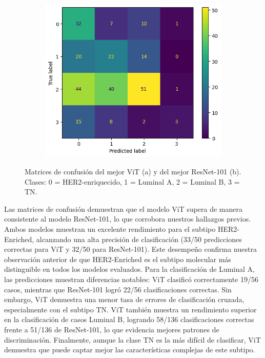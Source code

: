 \documentclass[a4paper,10pt]{book}
\begin{document}
\begin{figure}[h!]
\begin{subfigure}[t]{0.48\textwidth}
        \includegraphics[width=\textwidth]{reports/assets/CM-42-ResNet.png}
        \caption{}
        \label{fig:cm_resnet}
    \end{subfigure}
    \caption[Matrices de confusión Mejor ViT vs. Mejor ResNet]{Matrices de confusión del mejor ViT (a) y del mejor ResNet-101 (b). Clases: 0 = HER2-enriquecido, 1 = Luminal A, 2 = Luminal B, 3 = TN.}
    \label{fig:cm_vit_resnet}
\end{figure}

Las matrices de confusión demuestran que el modelo ViT supera de manera consistente al modelo ResNet-101, lo que corrobora nuestros hallazgos previos. Ambos modelos muestran un excelente rendimiento para el subtipo HER2-Enriched, alcanzando una alta precisión de clasificación (33/50 predicciones correctas para ViT y 32/50 para ResNet-101). Este desempeño confirma nuestra observación anterior de que HER2-Enriched es el subtipo molecular más distinguible en todos los modelos evaluados. Para la clasificación de Luminal A, las predicciones muestran diferencias notables: ViT clasificó correctamente 19/56 casos, mientras que ResNet-101 logró 22/56 clasificaciones correctas. Sin embargo, ViT demuestra una menor tasa de errores de clasificación cruzada, especialmente con el subtipo TN. ViT también muestra un rendimiento superior en la clasificación de casos Luminal B, logrando 58/136 clasificaciones correctas frente a 51/136 de ResNet-101, lo que evidencia mejores patrones de discriminación. Finalmente, aunque la clase TN es la más difícil de clasificar, ViT demuestra que puede captar mejor las características complejas de este subtipo.
\end{document}
